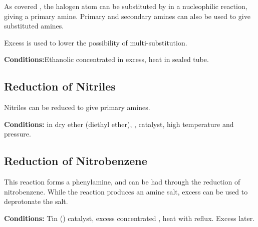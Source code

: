 			As covered \hyperlink{NucleophilicSubstitutionFormingAmines}{}, the halogen atom can be substituted by 
			in a nucleophilic reaction, giving a primary amine. Primary and secondary amines can also be used to give substituted amines.

			Excess  is used to lower the possibility of multi-substitution.

			\vspace{1.5em}
			\vbox{\textbf{Conditions:}\tabto{35mm}Ethanolic concentrated  in excess, heat in sealed tube.}




		\subsection{Reduction of Nitriles}

			Nitriles can be reduced to give primary amines.

			\vspace{1.5em}
			\vbox{\textbf{Conditions:}	\tabto{35mm} in dry ether (diethyl ether), 
										\tabto{35mm},  catalyst, high temperature and pressure.}




		\pagebreak
		\subsection{Reduction of Nitrobenzene}

			This reaction forms a phenylamine, and can be had through the reduction of nitrobenzene. While the reaction produces an amine
			salt, excess  can be used to deprotonate the salt.

			\vspace{1.5em}
			\vbox{\textbf{Conditions:}	\tabto{35mm}Tin () catalyst, excess concentrated ,
										\tabto{35mm}heat with reflux. Excess  later.}

